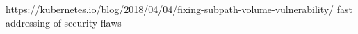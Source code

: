 https://kubernetes.io/blog/2018/04/04/fixing-subpath-volume-vulnerability/
fast addressing of security flaws
